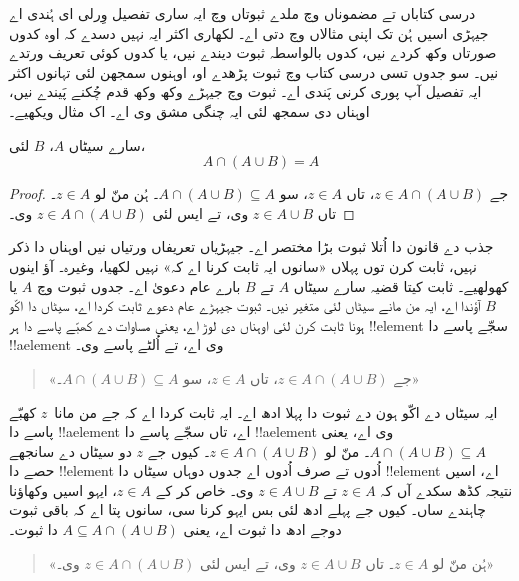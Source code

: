 \documentclass[../../../include/open-logic-section]{subfiles}
\begin{document}

درسی کتاباں تے مضموناں وچ ملدے ثبوتاں وچ ایہ ساری تفصیل وِرلی ای ہُندی اے جیہڑی اسیں ہُن تک اپنی مثالاں وچ دتی اے۔ لکھاری اکثر ایہ نہیں دسدے کہ اوہ کدوں صورتاں وکھ کردے نیں، کدوں بالواسطہ ثبوت دیندے نیں، یا کدوں کوئی تعریف ورتدے نیں۔ سو جدوں تسی درسی کتاب وچ ثبوت پڑھدے او، اوہنوں سمجھن لئی تہانوں اکثر ایہ تفصیل آپ پوری کرنی پَندی اے۔ ثبوت وچ جیہڑے وکھ وکھ قدم چُکنے پَیندے نیں، اوہناں دی سمجھ لئی ایہ چنگی مشق وی اے۔ اک مثال ویکھیے۔

\begin{prop}
سارے سیٹاں $A$، $B$ لئی،
\[
A \cap (A \cup B) = A
\]
\end{prop}

\begin{proof}
جے $z \in A \cap (A \cup B)$، تاں $z \in A$، سو $A \cap (A \cup B)
\subseteq A$۔ ہُن منّ لو $z \in A$۔ تاں $z \in A \cup B$ وی، تے ایس لئی $z \in A \cap (A \cup B)$ وی۔
\end{proof}

جذب دے قانون دا اُتلا ثبوت بڑا مختصر اے۔ جیہڑیاں تعریفاں ورتیاں نیں اوہناں دا ذکر نہیں، ثابت کرن توں پہلاں «سانوں ایہ ثابت کرنا اے کہ» نہیں لکھیا، وغیرہ۔ آؤ اینوں کھولھیے۔ ثابت کیتا قضیہ سارے سیٹاں $A$ تے $B$ بارے عام دعویٰ اے۔ جدوں ثبوت وچ $A$ یا $B$ آؤندا اے، ایہ من مانے سیٹاں لئی متغیر نیں۔ ثبوت جیہڑے عام دعوے ثابت کردا اے، سیٹاں دا اکّو ہونا ثابت کرن لئی اوہناں دی لوڑ اے، یعنی مساوات دے کھبّے پاسے دا ہر !!{element} سجّے پاسے دا !!a{element} وی اے، تے اُلٹے پاسے وی۔

\begin{quote}
«جے $z \in A \cap (A \cup B)$، تاں $z \in A$، سو $A \cap (A \cup B)
  \subseteq A$۔»
\end{quote}

ایہ سیٹاں دے اکّو ہون دے ثبوت دا پہلا ادھ اے۔ ایہ ثابت کردا اے کہ جے من مانا~$z$ کھبّے پاسے دا !!a{element} اے، تاں سجّے پاسے دا !!a{element} وی اے، یعنی $A \cap (A \cup B) \subseteq A$۔
منّ لو $z \in A \cap (A \cup B)$۔ کیوں جے $z$ دو سیٹاں دے سانجھے حصے دا !!{element} اُدوں تے صرف اُدوں اے جدوں دوہاں سیٹاں دا !!{element} اے، اسیں نتیجہ کڈھ سکدے آں کہ $z \in A$ تے $z \in A \cup B$ وی۔ خاص کر کے $z \in A$، ایہو اسیں وکھاؤنا چاہندے ساں۔ کیوں جے پہلے ادھ لئی بس ایہو کرنا سی، سانوں پتا اے کہ باقی ثبوت دوجے ادھ دا ثبوت اے، یعنی $A \subseteq A \cap
(A \cup B)$ دا ثبوت۔

\begin{quote}
«ہُن منّ لو $z \in A$۔ تاں $z \in A \cup B$ وی، تے ایس لئی $z \in A \cap (A \cup B)$ وی۔»
\end{quote}
\end{document}
